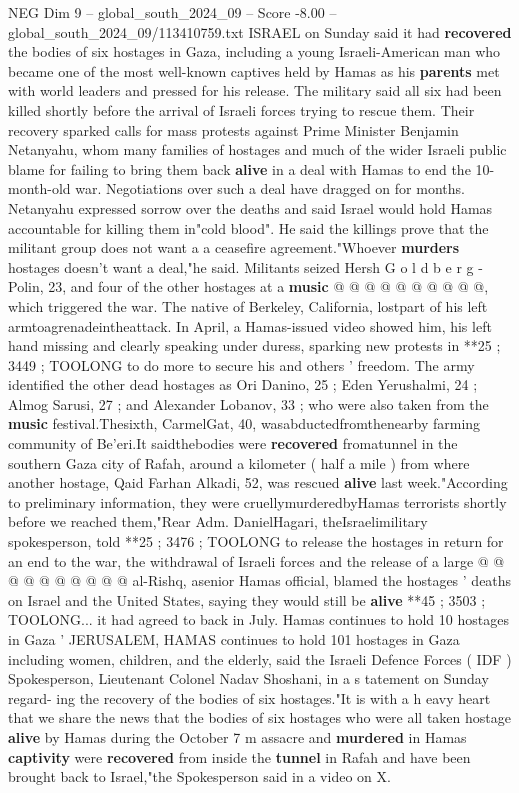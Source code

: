 \begin{textsample}{NEG Dim 9 – global\_south\_2024\_09 – Score -8.00 – global\_south\_2024\_09/113410759.txt}  \label{ex:f9_neg_108}
ISRAEL on Sunday said it had \textbf{recovered} the bodies of six hostages in Gaza, including a young Israeli-American man who became one of the most well-known captives held by Hamas as his \textbf{parents} met with world leaders and pressed for his release.
The military said all six had been killed shortly before the arrival of Israeli forces trying to rescue them.
Their recovery sparked calls for mass protests against Prime Minister Benjamin Netanyahu, whom many families of hostages and much of the wider Israeli public blame for failing to bring them back \textbf{alive} in a deal with Hamas to end the 10-month-old war.
Negotiations over such a deal have dragged on for months.
Netanyahu expressed sorrow over the deaths and said Israel would hold Hamas accountable for killing them in"cold blood".
He said the killings prove that the militant group does not want a a ceasefire agreement."Whoever \textbf{murders} hostages doesn't want a deal,"he said.
Militants seized Hersh G o l d b e r g - Polin, 23, and four of the other hostages at a \textbf{music} @ @ @ @ @ @ @ @ @ @, which triggered the war.
The native of Berkeley, California, lostpart of his left armtoagrenadeintheattack.
In April, a Hamas-issued video showed him, his left hand missing and clearly speaking under duress, sparking new protests in **25 ; 3449 ; TOOLONG to do more to secure his and others ' freedom.
The army identified the other dead hostages as Ori Danino, 25 ; Eden Yerushalmi, 24 ; Almog Sarusi, 27 ; and Alexander Lobanov, 33 ; who were also taken from the \textbf{music} festival.Thesixth, CarmelGat, 40, wasabductedfromthenearby farming community of Be'eri.It saidthebodies were \textbf{recovered} fromatunnel in the southern Gaza city of Rafah, around a kilometer ( half a mile ) from where another hostage, Qaid Farhan Alkadi, 52, was rescued \textbf{alive} last week."According to preliminary information, they were cruellymurderedbyHamas terrorists shortly before we reached them,"Rear Adm.
DanielHagari, theIsraelimilitary spokesperson, told **25 ; 3476 ; TOOLONG to release the hostages in return for an end to the war, the withdrawal of Israeli forces and the release of a large @ @ @ @ @ @ @ @ @ @ al-Rishq, asenior Hamas official, blamed the hostages ' deaths on Israel and the United States, saying they would still be \textbf{alive} **45 ; 3503 ; TOOLONG... it had agreed to back in July.
Hamas continues to hold 10 hostages in Gaza ' JERUSALEM, HAMAS continues to hold 101 hostages in Gaza including women, children, and the elderly, said the Israeli Defence Forces ( IDF ) Spokesperson, Lieutenant Colonel Nadav Shoshani, in a s tatement on Sunday regard- ing the recovery of the bodies of six hostages."It is with a h eavy heart that we share the news that the bodies of six hostages who were all taken hostage \textbf{alive} by Hamas during the October 7 m assacre and \textbf{murdered} in Hamas \textbf{captivity} were \textbf{recovered} from inside the \textbf{tunnel} in Rafah and have been brought back to Israel,"the Spokesperson said in a video on X.

\end{textsample}
